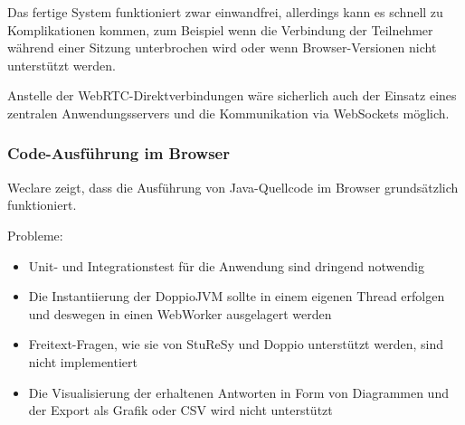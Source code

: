 Das fertige System funktioniert zwar einwandfrei, allerdings kann es schnell zu Komplikationen kommen, zum Beispiel wenn die Verbindung der Teilnehmer während einer Sitzung unterbrochen wird oder wenn Browser-Versionen nicht unterstützt werden.

Anstelle der WebRTC-Direktverbindungen wäre sicherlich auch der Einsatz eines zentralen Anwendungsservers und die Kommunikation via WebSockets möglich.

\subsubsection*{Code-Ausführung im Browser}
Weclare zeigt, dass die Ausführung von Java-Quellcode im Browser grundsätzlich funktioniert.

Probleme:
\begin{itemize}
    \item Unit- und Integrationstest für die Anwendung sind dringend notwendig
    \item Die Instantiierung der DoppioJVM sollte in einem eigenen Thread erfolgen und deswegen in einen WebWorker ausgelagert werden
    \item Freitext-Fragen, wie sie von StuReSy und Doppio unterstützt werden, sind nicht implementiert
    \item Die Visualisierung der erhaltenen Antworten in Form von Diagrammen und der Export als Grafik oder CSV wird nicht unterstützt
\end{itemize}




